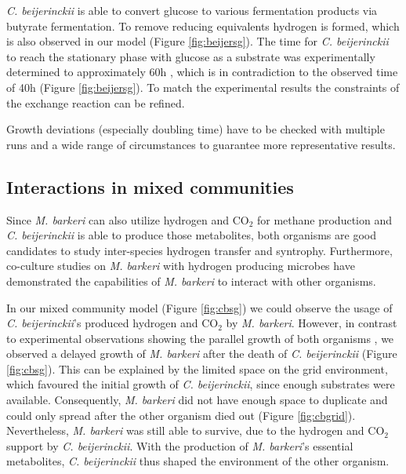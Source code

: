 \textit{C. beijerinckii} is able to convert glucose to various fermentation products \cite{Ezeji03} via butyrate fermentation. To remove reducing equivalents hydrogen is formed, which is also observed in our model (Figure \hyperref[fig:beijersg]{\ref{fig:beijersg}}). The time for \textit{C. beijerinckii} to reach the stationary phase with glucose as a substrate was experimentally determined to approximately 60\;h \cite{Ezeji03}, which is in contradiction to the observed time of 40\;h (Figure \hyperref[fig:beijersg]{\ref{fig:beijersg}}). To match the experimental results the constraints of the exchange reaction can be refined.

Growth deviations (especially doubling time) have to be checked with multiple runs and a wide range of circumstances to guarantee more representative results.

\subsection{Interactions in mixed communities}
Since \textit{M. barkeri} can also utilize hydrogen and CO$_2$ for methane production and \textit{C. beijerinckii} is able to produce those metabolites, both organisms are good candidates to study inter-species hydrogen transfer and syntrophy.
Furthermore, co-culture studies on \textit{M. barkeri} with hydrogen producing microbes \cite{Winter79} have demonstrated the capabilities of \textit{M. barkeri} to interact with other organisms.

In our mixed community model (Figure \hyperref[fig:cbsg]{\ref{fig:cbsg}}) we could observe the usage of \textit{C. beijerinckii}'s produced hydrogen and CO$_2$ by \textit{M. barkeri}. However, in contrast to experimental observations showing the parallel growth of both organisms \cite{Winter79}, we observed a delayed growth of \textit{M. barkeri} after the death of \textit{C. beijerinckii} (Figure \hyperref[fig:cbsg]{\ref{fig:cbsg}}). This can be explained by the limited space on the grid environment, which favoured the initial growth of \textit{C. beijerinckii}, since enough substrates were available. Consequently, \textit{M. barkeri} did not have enough space to duplicate and could only spread after the other organism died out (Figure \hyperref[fig:cbgrid]{\ref{fig:cbgrid}}). 
Nevertheless, \textit{M. barkeri} was still able to survive, due to the hydrogen and CO$_2$ support by \textit{C. beijerinckii}.
With the production of \textit{M. barkeri}'s essential metabolites, \textit{C. beijerinckii} thus shaped the environment of the other organism.

